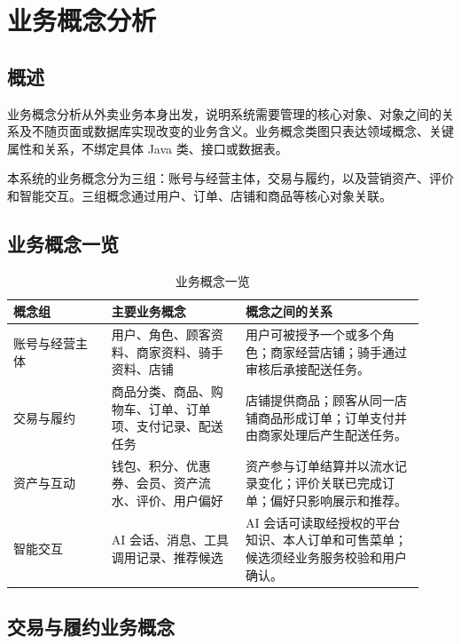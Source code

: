 \section{业务概念分析}

\subsection{概述}

业务概念分析从外卖业务本身出发，说明系统需要管理的核心对象、对象之间的关系及不随页面或数据库实现改变的业务含义。业务概念类图只表达领域概念、关键属性和关系，不绑定具体 Java 类、接口或数据表。

本系统的业务概念分为三组：账号与经营主体，交易与履约，以及营销资产、评价和智能交互。三组概念通过用户、订单、店铺和商品等核心对象关联。

\subsection{业务概念一览}

\begin{longtable}{|L{0.22\linewidth}|L{0.30\linewidth}|L{0.40\linewidth}|}
\caption{业务概念一览}\label{tab:business-concepts}\\ \hline
\textbf{概念组} & \textbf{主要业务概念} & \textbf{概念之间的关系} \\ \hline
账号与经营主体 & 用户、角色、顾客资料、商家资料、骑手资料、店铺 & 用户可被授予一个或多个角色；商家经营店铺；骑手通过审核后承接配送任务。 \\ \hline
交易与履约 & 商品分类、商品、购物车、订单、订单项、支付记录、配送任务 & 店铺提供商品；顾客从同一店铺商品形成订单；订单支付并由商家处理后产生配送任务。 \\ \hline
资产与互动 & 钱包、积分、优惠券、会员、资产流水、评价、用户偏好 & 资产参与订单结算并以流水记录变化；评价关联已完成订单；偏好只影响展示和推荐。 \\ \hline
智能交互 & AI 会话、消息、工具调用记录、推荐候选 & AI 会话可读取经授权的平台知识、本人订单和可售菜单；候选须经业务服务校验和用户确认。 \\ \hline
\end{longtable}

\subsection{交易与履约业务概念}

